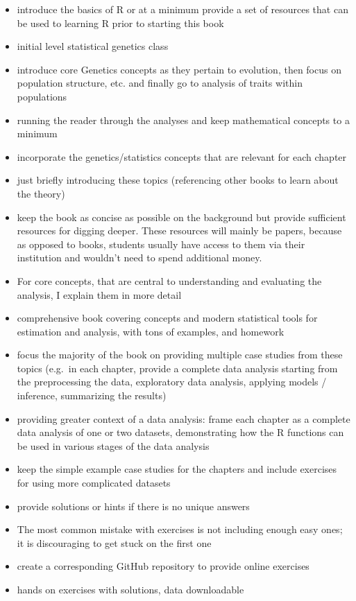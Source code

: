 \documentclass[12pt,]{book}
\begin{document}
\begin{itemize}
\item
  introduce the basics of R or at a minimum provide a set of resources
  that can be used to learning R prior to starting this book
\item
  initial level statistical genetics class
\item
  introduce core Genetics concepts as they pertain to evolution, then
  focus on population structure, etc. and finally go to analysis of
  traits within populations
\item
  running the reader through the analyses and keep mathematical concepts
  to a minimum
\item
  incorporate the genetics/statistics concepts that are relevant for
  each chapter
\item
  just briefly introducing these topics (referencing other books to
  learn about the theory)
\item
  keep the book as concise as possible on the background but provide
  sufficient resources for digging deeper. These resources will mainly
  be papers, because as opposed to books, students usually have access
  to them via their institution and wouldn't need to spend additional
  money.
\item
  For core concepts, that are central to understanding and evaluating
  the analysis, I explain them in more detail
\item
  comprehensive book covering concepts and modern statistical tools for
  estimation and analysis, with tons of examples, and homework
\item
  focus the majority of the book on providing multiple case studies from
  these topics (e.g.~in each chapter, provide a complete data analysis
  starting from the preprocessing the data, exploratory data analysis,
  applying models / inference, summarizing the results)
\item
  providing greater context of a data analysis: frame each chapter as a
  complete data analysis of one or two datasets, demonstrating how the R
  functions can be used in various stages of the data analysis
\item
  keep the simple example case studies for the chapters and include
  exercises for using more complicated datasets
\item
  provide solutions or hints if there is no unique answers
\item
  The most common mistake with exercises is not including enough easy
  ones; it is discouraging to get stuck on the first one
\item
  create a corresponding GitHub repository to provide online exercises
\item
  hands on exercises with solutions, data downloadable
\end{itemize}
\end{document}
